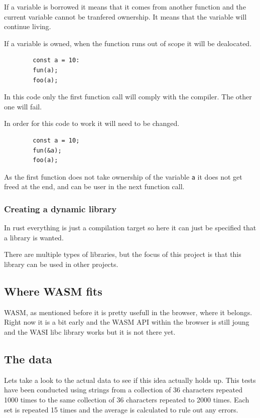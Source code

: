 \documentclass[12pt, letterpaper]{article}
\begin{document}
\begin{multicols}{2}
    If a variable is borrowed it means that it comes from another function and the current variable cannot be tranfered ownership. It means that the variable will continue living.

    If a variable is owned, when the function runs out of scope it will be dealocated.

    \begin{lstlisting}
        const a = 10:
        fun(a);
        foo(a);
    \end{lstlisting}

    In this code only the first function call will comply with the compiler. The other one will fail.

    In order for this code to work it will need to be changed.

    \begin{lstlisting}
        const a = 10;
        fun(&a);
        foo(a);
    \end{lstlisting}

    As the first function does not take ownership of the variable \verb|a| it does not get freed at the end, and can be user in the next function call.

    \subsubsection{Creating a dynamic library}

    In rust everything is just a compilation target so here it can just be specified that a library is wanted.

    There are multiple types of libraries, but the focus of this project is that this library can be used in other projects.

    \subsection{Where WASM fits}

    WASM, as mentioned before it is pretty usefull in the browser, where it belongs. Right now it is a bit early and the WASM API within the browser is still joung and the WASI libc library works but it is not there yet.

    \subsection{The data}

    Lets take a look to the actual data to see if this idea actually holds up. This tests have been conducted using strings from a collection of 36 characters repeated 1000 times to the same collection of 36 characters repeated to 2000 times. Each set is repeated 15 times and the average is calculated to rule out any errors.


\end{multicols}
\end{document}
